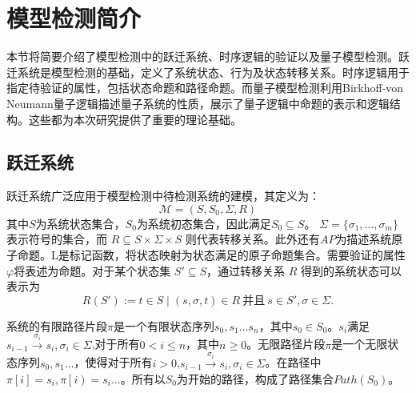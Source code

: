 \section{模型检测简介}
本节将简要介绍了模型检测中的跃迁系统、时序逻辑的验证以及量子模型检测。跃迁系统是模型检测的基础，定义了系统状态、行为及状态转移关系。时序逻辑用于指定待验证的属性，包括状态命题和路径命题。而量子模型检测利用Birkhoff-von Neumann量子逻辑描述量子系统的性质，展示了量子逻辑中命题的表示和逻辑结构。这些都为本次研究提供了重要的理论基础。
\subsection{跃迁系统}
\label{sec-transition}
跃迁系统广泛应用于模型检测中待检测系统的建模，其定义为\citep{baier2008principles}：
\begin{equation}
\mathcal{M}=(S, S_0, \Sigma, R)
\end{equation}
其中\(S\)为系统状态集合，\(S_0\)为系统初态集合，因此满足\(S_0\subseteq S\)。 $\Sigma=\{\sigma_1,\ldots,\sigma_m\}$ 表示符号的集合，而 $R \subseteq S \times \Sigma \times S$ 则代表转移关系。此外还有\(AP\)为描述系统原子命题。L是标记函数，将状态映射为状态满足的原子命题集合。需要验证的属性\(\varphi\)将表述为命题。对于某个状态集 $S' \subseteq S$，通过转移关系 $R$ 得到的系统状态可以表示为
\begin{equation}\label{eq:image}
R(S') := { t\in S \mid (s, \sigma, t) \in R\ \text{并且}\ s \in S', \sigma \in \Sigma}.
\end{equation}


系统的有限路径片段\(\pi\)是一个有限状态序列\(s_0,s_1\ldots s_n\)，其中\(s_0\in S_0\)。\(s_i\)满足\(s_{i-1}\overset{\sigma_i}{\rightarrow}s_i,\sigma_i\in \Sigma\),对于所有\(0<i\leq n\)，其中\(n\geq 0 \)。无限路径片段\(\pi\)是一个无限状态序列\(s_0,s_1\ldots\)，使得对于所有\(i>0\),\(s_{i-1} \overset{\sigma_i}{\rightarrow}  s_i,\sigma_i\in \Sigma\)。在路径中\(\pi\left[i\right]=s_i,\pi\left[i\right)=s_i\ldots\)。所有以\(S_0\)为开始的路径，构成了路径集合\(Path\left(S_0\right)\)。

